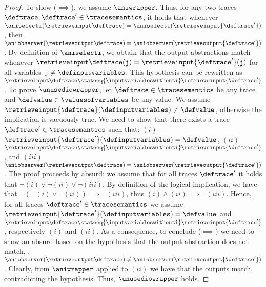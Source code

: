 \begin{proof}
  To show ($\implies$), we assume $\aniwrapper$.
  Thus, for any two traces $\deftrace, \deftrace'\in\tracesemantics$, it holds that whenever $\aniselecti(\retrieveinput\deftrace) = \aniselecti(\retrieveinput{\deftrace'})$, then $\aniobserver(\retrieveoutput\deftrace) = \aniobserver(\retrieveoutput{\deftrace'})$. By definition of $\aniselecti$, we obtain that the output abstractions match whenever $\retrieveinput\deftrace(\texttt{j}) = \retrieveinput{\deftrace'}(\texttt{j})$ for all variables $\texttt{j} \neq \definputvariables$. This hypothesis can be rewritten as $\retrieveinput\deftrace \stateeq{\inputvariableswithouti} \retrieveinput{\deftrace'}$.
  To prove $\unusediowrapper$,
  let $\deftrace\in\tracesemantics$ be any trace and $\defvalue\in\valuesofvariables$ be any value.
  We assume $\retrieveinput{\deftrace}(\definputvariables) \neq \defvalue$, otherwise the implication is vacuously true.
  We need to show that there exists a trace $\deftrace'\in\tracesemantics$ such that: $(i)$ $\retrieveinput{\deftrace'}(\definputvariables) = \defvalue$, $(ii)$ $\retrieveinput\deftrace \stateeq{\inputvariableswithouti} \retrieveinput{\deftrace'}$, and $(iii)$ $\aniobserver(\retrieveoutput\deftrace) = \aniobserver(\retrieveoutput{\deftrace'})$.
  The proof proceeds by absurd: we assume that for all traces $\deftrace'$ it holds that $\neg(i) \lor \neg(ii) \lor \neg(iii)$.
  By definition of the logical implication, we have that $\neg(\neg(i) \lor \neg(ii)) \implies \neg(iii)$, thus $(i) \land (ii) \implies \neg(iii)$.
  Hence, for all traces $\deftrace'\in\tracesemantics$ we assume $\retrieveinput{\deftrace'}(\definputvariables) = \defvalue$ and $\retrieveinput\deftrace \stateeq{\inputvariableswithouti} \retrieveinput{\deftrace'}$, respectively $(i)$ and $(ii)$.
  As a consequence, to conclude ($\implies$) we need to show an absurd based on the hypothesis that the output abstraction does not match, \ie, $\aniobserver(\retrieveoutput\deftrace) \neq \aniobserver(\retrieveoutput{\deftrace'})$.
  Clearly, from $\aniwrapper$ applied to $(ii)$ we have that the outputs match, contradicting the hypothesis. Thus, $\unusediowrapper$ holds.


\end{proof}
